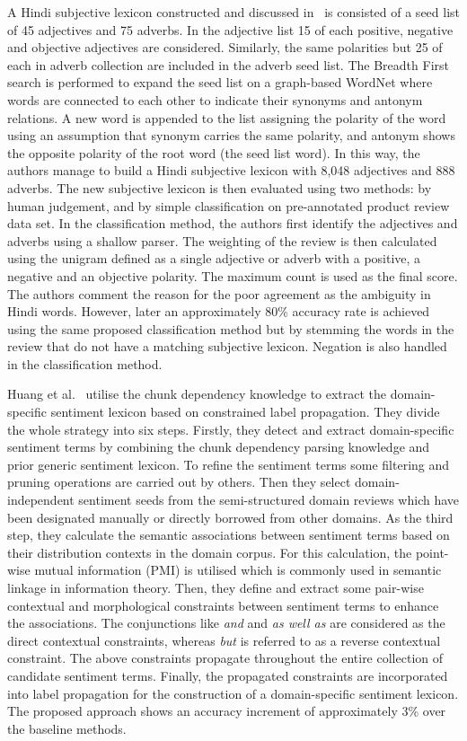 A Hindi subjective lexicon constructed and discussed in~\cite{BAV12} is consisted
of a seed list of 45 adjectives and 75 adverbs.
In the adjective list 15 of each positive, negative
and objective adjectives are considered.
Similarly, the same polarities but 25 of each in adverb collection are included
in the adverb seed list.
The Breadth First search is performed to expand the seed list
on a graph-based WordNet where words are connected to each other
to indicate their synonyms and antonym relations.
A new word is appended to the list assigning the polarity of the word
using an assumption that synonym carries the same polarity,
and antonym shows the opposite polarity of the root word (the seed list word).
In this way, the authors manage to build a Hindi subjective lexicon
with 8,048 adjectives and 888 adverbs.
The new subjective lexicon is then evaluated using two methods:
by human judgement,
and by simple classification on pre-annotated product review data set.
In the classification method,
the authors first identify the adjectives and adverbs using a shallow parser.
The weighting of the review is then calculated using the unigram
defined as a single adjective or adverb
with a positive, a negative and an objective polarity.
The maximum count is used as the final score.
The authors comment the reason for the poor agreement as the ambiguity in Hindi words.
However, later an approximately 80\% accuracy rate is achieved
using the same proposed classification method
but by stemming the words in the review that do not have a matching subjective lexicon. Negation is also handled in the classification method.

Huang et al.~\cite{HNS14} utilise the chunk dependency knowledge
to extract the domain-specific sentiment lexicon based on constrained label propagation. They divide the whole strategy into six steps.
Firstly, they detect and extract domain-specific sentiment terms
by combining the chunk dependency parsing knowledge and prior generic sentiment lexicon.
To refine the sentiment terms some filtering and pruning operations are carried out
by others.
Then they select domain-independent sentiment seeds
from the semi-structured domain reviews which have been designated manually
or directly borrowed from other domains.
As the third step, they calculate the semantic associations between sentiment terms
based on their distribution contexts in the domain corpus.
For this calculation, the point-wise mutual information (PMI) is utilised
which is commonly used in semantic linkage in information theory.
Then, they define and extract some pair-wise contextual and morphological constraints
between sentiment terms to enhance the associations.
The conjunctions like \emph{and} and \emph{as well as} are considered
as the direct contextual constraints, whereas \emph{but} is referred to
as a reverse contextual constraint.
The above constraints propagate throughout the entire collection
of candidate sentiment terms.
Finally, the propagated constraints are incorporated into label propagation
for the construction of a domain-specific sentiment lexicon.
The proposed approach shows an accuracy increment
of approximately 3\% over the baseline methods.

